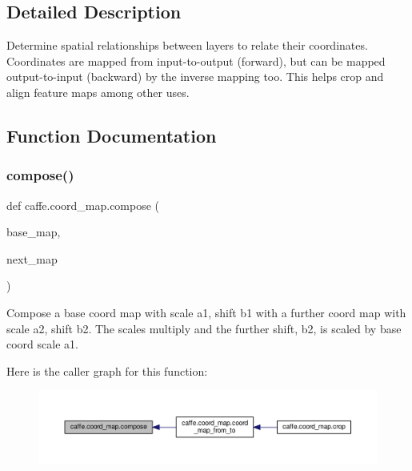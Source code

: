 \subsection{Detailed Description}
\begin{DoxyVerb}Determine spatial relationships between layers to relate their coordinates.
Coordinates are mapped from input-to-output (forward), but can
be mapped output-to-input (backward) by the inverse mapping too.
This helps crop and align feature maps among other uses.
\end{DoxyVerb}
 

\subsection{Function Documentation}
\mbox{\label{namespacecaffe_1_1coord__map_a06830f75738dcbc0b29bfeb30ae4f990}} 
\subsubsection{\texorpdfstring{compose()}{compose()}}
{\footnotesize\ttfamily def caffe.\+coord\+\_\+map.\+compose (\begin{DoxyParamCaption}\item[{}]{base\+\_\+map,  }\item[{}]{next\+\_\+map }\end{DoxyParamCaption})}

\begin{DoxyVerb}Compose a base coord map with scale a1, shift b1 with a further coord map
with scale a2, shift b2. The scales multiply and the further shift, b2,
is scaled by base coord scale a1.
\end{DoxyVerb}
 Here is the caller graph for this function\+:
\nopagebreak
\begin{figure}[H]
\begin{center}
\leavevmode
\includegraphics[width=350pt]{namespacecaffe_1_1coord__map_a06830f75738dcbc0b29bfeb30ae4f990_icgraph}
\end{center}
\end{figure}
\mbox{\label{namespacecaffe_1_1coord__map_a1683f31b74339c8ac4c4985132fdecfc}} 
